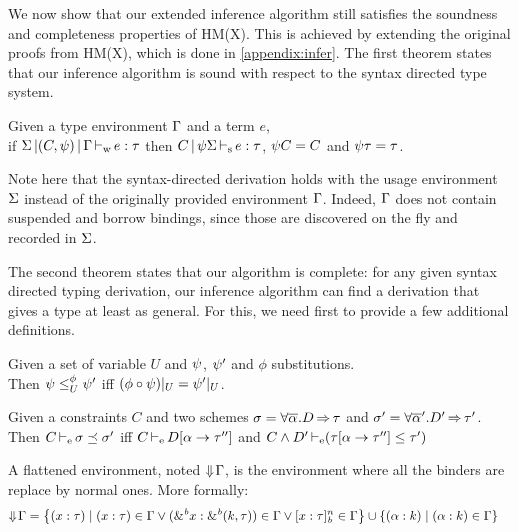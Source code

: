 We now show that our extended inference algorithm still satisfies the soundness
and completeness properties of HM(X). This is achieved by extending
the original proofs from HM(X), which is done in \cref{appendix:infer}.
%
The first theorem states that our inference algorithm is sound
with respect to the syntax directed type system.

\begin{theorem}
  Given a type environment $\E$ and a term $e$,\\
  if $\inferW{\Sv}{(C,\unif)}{\E}{e}{\tau}$
  then $\inferS{C}{\unif\Sv}{e}{\tau}$, $\unif C = C$ and $\unif \tau = \tau$.
\end{theorem}

Note here that the syntax-directed derivation holds with the usage environment $\Sv$ instead of the originally provided environment $\E$. Indeed,
$\E$ does not contain suspended and borrow bindings, since those
are discovered on the fly and recorded in $\Sv$.

The second theorem states that our algorithm is complete: for any given
syntax directed typing derivation, our inference algorithm can find
a derivation that gives a type at least as general.
For this, we need first to provide a few additional definitions.

\begin{definition}
  Given a set of variable $U$ and $\unif$, $\unif'$ and $\phi$
  substitutions. \\
  Then
  $\unif \leq^{\phi}_{U} \unif'$ iff $(\phi \circ \unif)|_{U} = \unif'|_U$.
\end{definition}

\begin{definition}
  Given a constraints $C$ and two schemes
  $\schm = \forall \Multi\tvar. \qual{D}{\tau}$ and
  $\schm' = \forall \Multi\tvar'. \qual{D'}{\tau'} $.
  Then $\entail{C}{\schm \preceq \schm'}$
  iff $\entail{C}{\subst{\tvar}{\tau''} D}$
  and $\entail{C\Cand D'}{\Cleq{\subst{\tvar}{\tau''}\tau}{\tau'}}$
\end{definition}

\begin{definition}
A flattened environment,
noted $\Eflat\E$, is the environment
where all the binders are replace by normal ones. More formally:
\begin{align*}
  \Eflat\E
  &= \left\{ \bvar{x}{\tau} \mid
    \bvar{x}{\tau}\in\E
    \vee \bvar{\borrow{x}}{\borrowty{k}{\tau}}\in\E
    \vee \svar{x}{\tau}^n\in\E
    \right\} \cup \left\{ \bvar{\tvar}{k} \mid \bvar{\tvar}{k}\in\E \right\}
\end{align*}
\end{definition}


